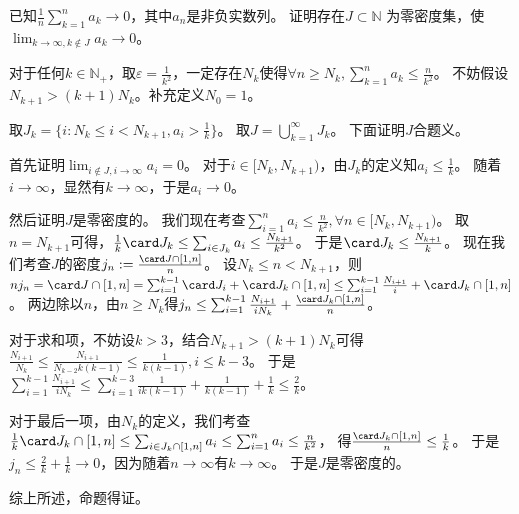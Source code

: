 \documentclass{ctexart}
\begin{document}
\begin{problem}\label{pro:4}
  已知\(\frac{1}{n}\sum_{k=1}^{n}a_k \to 0 \)，其中\(a_n \)是非负实数列。
  证明存在\(J \subset \mathbb{N} \) 为零密度集，使\(\lim_{k \to \infty,k \notin J}a_k \to 0 \)。
\end{problem}
\begin{solution}
  对于任何\(k \in \mathbb{N}_+ \)，取\(\varepsilon = \frac{1}{k^2} \)，一定存在\(N_k \)使得\(\forall n \geq N_k,\sum_{k = 1}^{n}a_k \leq \frac{n}{k^2} \)。
  不妨假设\(N_{k+1}>(k+1)N_k \)。补充定义\(N_{0}=1 \)。

  取\(J_k = \{i: N_k \leq i < N_{k + 1},a_i > \frac{1}{k}\} \)。
  取\(J=\bigcup_{k=1}^{\infty}J_k \)。
  下面证明\(J \)合题义。

  首先证明\(\lim_{i \notin J,i \to \infty}a_i = 0 \)。
  对于\(i \in [N_k,N_{k + 1}) \)，由\(J_k \)的定义知\(a_i \leq \frac{1}{k} \)。
  随着\(i \to \infty \)，显然有\(k \to \infty \)，于是\(a_i \to 0 \)。

  然后证明\(J \)是零密度的。
  我们现在考查\(\sum_{i =1}^{n}a_i \leq \frac{n}{k^2},\forall n \in [N_k,N_{k + 1}) \)。
  取\(n = N_{k + 1} \)可得，\(\frac{1}{k} \card J_k \leq \sum_{i \in J_k}a_i \leq \frac{N_{k+1}}{k^2} \)。
  于是\(\card J_k \leq \frac{ N_{k + 1}}{k} \)。
  现在我们考查\(J \)的密度\(j_n : = \frac{\card J \cap [1,n]}{n} \)。
  设\(N_k \leq n < N_{k + 1} \)，则\(nj_n = \card J \cap [1,n] = \sum_{i = 1}^{k - 1}\card J_i + \card J_k \cap [1,n] \leq \sum_{i = 1}^{k - 1} \frac{N_{i + 1}}{i} + \card J_k \cap [1,n]\)。
  两边除以\(n \)，由\(n \geq N_k \)得\(j_n \leq \sum_{i = 1}^{k - 1}\frac{ N_{i + 1}}{i N_k} + \frac{\card J_k \cap [1,n]}{n} \)。

  对于求和项，不妨设\(k>3 \)，结合\(N_{k + 1} > (k+1)N_k \)可得
  \(\frac{N_{i+1}}{N_k} \leq \frac{N_{i+1}}{N_{k-2}k(k-1)} \leq \frac{1}{k(k-1)},i \leq k-3 \)。
  于是\(\sum_{i = 1}^{k-1}\frac{ N_{i + 1}}{i N_k} \leq \sum_{i=1}^{k-3}\frac{1}{ik(k-1)} + \frac{1}{k(k-1)} + \frac{1}{k} \leq \frac{2}{k} \)。

  对于最后一项，由\(N_k \)的定义，我们考查\(\frac{1}{k}\card J_k \cap [1,n] \leq \sum_{i \in J_k \cap [1,n]}a_i \leq \sum_{i=1}^{n}a_i \leq \frac{n}{k^2}\)，
  得\(\frac{\card J_k \cap [1,n]}{n} \leq \frac{1}{k} \)。
  于是\(j_n \leq \frac{2}{k} + \frac{1}{k} \to 0 \)，因为随着\(n \to \infty \)有\(k \to \infty \)。
  于是\(J \)是零密度的。

  综上所述，命题得证。
\end{solution}
\end{document}
